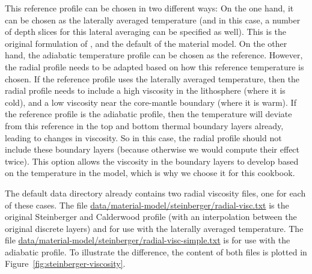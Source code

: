 This reference profile can be chosen in two different ways: On the one hand, it can be chosen as the laterally averaged temperature (and in this case, a number of depth slices for this lateral averaging can be specified as  well). This is the original formulation of \cite{stca06}, and the default of the material model. 
On the other hand, the adiabatic temperature profile can be chosen as the reference. 
However, the radial profile needs to be adapted based on how this reference temperature is chosen. 
If the reference profile uses the laterally averaged temperature, then the radial profile needs to include a high viscosity in the lithosphere (where it is cold), and a low viscosity near the core-mantle boundary (where it is warm). If the reference profile is the adiabatic profile, then the temperature will deviate from this reference in the top and bottom thermal boundary layers already, leading to changes in viscosity. So in this case, the radial profile should not include these boundary layers (because otherwise we would compute their effect twice). This option allows the viscosity in the boundary layers to develop based on the temperature in the model, which is why we choose it for this cookbook. 

The default data directory already contains two radial viscosity files, one for each of these cases. 
The file \url{data/material-model/steinberger/radial-visc.txt} is the original Steinberger and Calderwood \cite{stca06} profile (with an interpolation between the original discrete layers) and for use with the laterally averaged temperature. The file \url{data/material-model/steinberger/radial-visc-simple.txt} is for use with the adiabatic profile. To illustrate the difference, the content of both files is plotted in Figure~\ref{fig:steinberger-viscosity}. 

